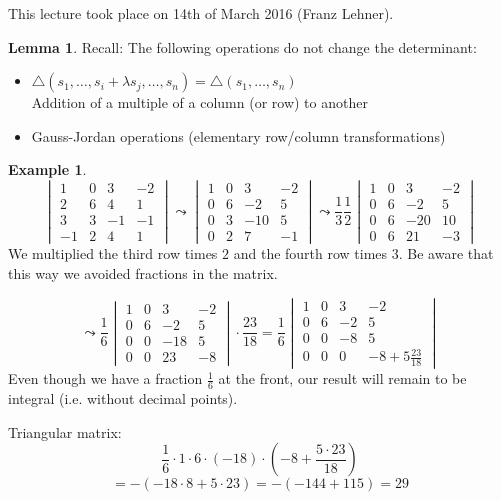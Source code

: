 \documentclass[a4paper,landscape,twocolumn]{article}
\newcommand\meta[3]{This #1 took place on #2 (#3).\par}
\theoremstyle{definition}
\newtheorem{ex}{Example}
\newtheorem{lemma}{Lemma}
\begin{document}
\meta{lecture}{14th of March 2016}{Franz Lehner}

\begin{lemma}
  Recall: The following operations do not change the determinant:
  \begin{itemize}
    \item $\triangle(s_1, \ldots, s_i + \lambda s_j, \ldots, s_n) = \triangle(s_1, \ldots, s_n)$ \\
      Addition of a multiple of a column (or row) to another
    \item Gauss-Jordan operations (elementary row/column transformations)
  \end{itemize}
\end{lemma}

\begin{ex}
  \[
    \begin{vmatrix}
      1 & 0 & 3 & -2 \\
      2 & 6 & 4 & 1 \\
      3 & 3 & -1 & -1 \\
      -1 & 2 & 4 & 1
    \end{vmatrix}
    \leadsto
    \begin{vmatrix}
      1 & 0 & 3 & -2 \\
      0 & 6 & -2 & 5 \\
      0 & 3 & -10 & 5 \\
      0 & 2 & 7 & -1
    \end{vmatrix}
    \leadsto
    \frac13
    \frac12
    \begin{vmatrix}
      1 & 0 & 3 & -2 \\
      0 & 6 & -2 & 5 \\
      0 & 6 & -20 & 10 \\
      0 & 6 & 21 & -3
    \end{vmatrix}
  \]
  We multiplied the third row times $2$ and the fourth row times $3$.
  Be aware that this way we avoided fractions in the matrix.

  \[
    \leadsto
    \frac16
    \begin{vmatrix}
      1 & 0 & 3 & -2 \\
      0 & 6 & -2 & 5 \\
      0 & 0 & -18 & 5 \\
      0 & 0 & 23 & -8
    \end{vmatrix}
    \cdot \frac{23}{18}
    = \frac16
    \begin{vmatrix}
      1 & 0 & 3 & -2 \\
      0 & 6 & -2 & 5 \\
      0 & 0 & -8 & 5 \\
      0 & 0 & 0 & -8+5\frac{23}{18}
    \end{vmatrix}
  \]
  Even though we have a fraction $\frac16$ at the front, our result will
  remain to be integral (i.e. without decimal points).

  Triangular matrix:
  \[ \frac16 \cdot 1 \cdot 6 \cdot (-18) \cdot \left(-8 + \frac{5 \cdot 23}{18}\right) \]
  \[ = -(-18\cdot 8 + 5\cdot 23) = -(-144 + 115) = 29 \]
\end{ex}
\end{document}
